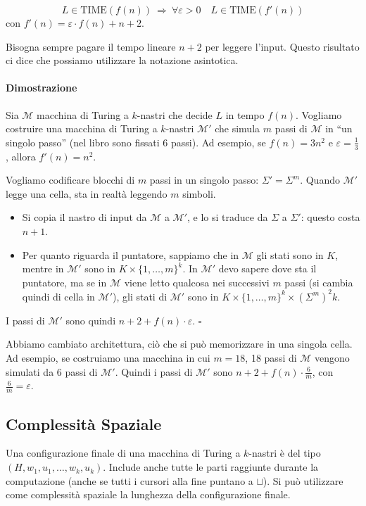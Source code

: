 \begin{theorem}
    $$
        L\in\text{TIME}(f(n))
        ~\Rightarrow~
        \forall\varepsilon>0\quad L\in\text{TIME}(f'(n))
    $$
    con $f'(n)=\varepsilon\cdot f(n)+n+2$.
\end{theorem}
Bisogna sempre pagare il tempo lineare $n+2$ per leggere l'input. Questo risultato ci dice che possiamo utilizzare la notazione asintotica.

\paragraph{Dimostrazione} Sia $\mathcal{M}$ macchina di Turing a $k$-nastri che decide $L$ in tempo $f(n)$. Vogliamo costruire una macchina di Turing a $k$-nastri $\mathcal{M}'$ che simula $m$ passi di $\mathcal{M}$ in ``un singolo passo'' (nel libro sono fissati 6 passi). Ad esempio, se $f(n)=3n^2$ e $\varepsilon=\frac{1}{3}$, allora $f'(n)=n^2$.

Vogliamo codificare blocchi di $m$ passi in un singolo passo: $\Sigma'=\Sigma^m$. Quando $\mathcal{M}'$ legge una cella, sta in realtà leggendo $m$ simboli. 
\begin{itemize}
    \item Si copia il nastro di input da $\mathcal{M}$ a $\mathcal{M}'$, e lo si traduce da $\Sigma$ a $\Sigma'$: questo costa $n+1$.
    \item Per quanto riguarda il puntatore, sappiamo che in $\mathcal{M}$ gli stati sono in $K$, mentre in $\mathcal{M}'$ sono in $K\times\{1,\dots,m\}^k$. In $\mathcal{M}'$ devo sapere dove sta il puntatore, ma se in $\mathcal{M}$ viene letto qualcosa nei successivi $m$ passi (si cambia quindi di cella in $\mathcal{M}'$), gli stati di $\mathcal{M}'$ sono in $K\times\{1,\dots,m\}^k\times (\Sigma^m)^2k$.
\end{itemize}
I passi di $\mathcal{M}'$ sono quindi $n+2+f(n)\cdot\varepsilon$. \hfill $\square$\medskip

Abbiamo cambiato architettura, ciò che si può memorizzare in una singola cella. Ad esempio, se costruiamo una macchina in cui $m=18$, 18 passi di $\mathcal{M}$ vengono simulati da 6 passi di $\mathcal{M}'$. Quindi i passi di $\mathcal{M}'$ sono $n+2+f(n)\cdot\frac{6}{m}$, con $\frac{6}{m}=\varepsilon$.





\subsection{Complessità Spaziale}
Una configurazione finale di una macchina di Turing a $k$-nastri è del tipo $(H,w_1,u_1,\dots,w_k,u_k)$. Include anche tutte le parti raggiunte durante la computazione (anche se tutti i cursori alla fine puntano a $\sqcup$). Si può utilizzare come complessità spaziale la lunghezza della configurazione finale.

